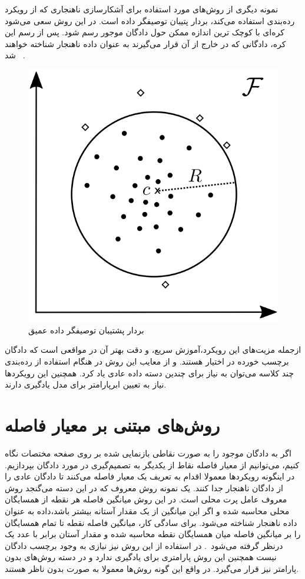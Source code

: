 \documentclass[12pt,a4paper]{report}
\theoremstyle{definition}
\theoremstyle{definition}
\begin{document}
نمونه دیگری از روش‌های مورد استفاده برای آشکارسازی ناهنجاری که از رویکرد رده‌بندی استفاده می‌کند، بردار پتیبان توصیفگر داده‌ است. در این روش سعی می‌شود کره‌ای با کوچک ترین اندازه ممکن حول دادگان موجور رسم شود. پس از رسم این کره، دادگانی که در خارج از آن قرار می‌گیرند به عنوان داده ناهنجار شناخته خواهند شد~\cite{pmlr-v80-ruff18a} .
\begin{figure}[!h]
	\begin{center}
		\includegraphics[width=0.5\linewidth]{./images/figures/svdd.png}
	\end{center}
	\caption{بردار پشتیبان توصیفگر داده عمیق~\cite{pmlr-v80-ruff18a}}
	\label{fig:deep-svdd}
	\centering
\end{figure}

ازجمله مزیت‌های این رویکرد،‌آموزش سریع، و دقت بهتر آن در مواقعی است که دادگان برچسب خورده در اختیار هستند. و از معایب این روش در هنگام استفاده از رده‌بندی چند کلاسه می‌توان به نیاز برای چندین دسته داده عادی یاد کرد. همچنین این رویکرد‌ها نیاز به تعیین ابرپارامتر برای مدل یادگیری دارند.

\section{روش‌های مبتنی بر معیار فاصله}
اگر به دادگان موجود را به صورت نقاطی بازنمایی شده بر روی صفحه مختصات نگاه کنیم،‌ می‌توانیم از معیار فاصله نقاط از یکدیگر به تصمیم‌گیری در مورد دادگان بپردازیم. در اینگونه رویکرد‌ها معمولا اقدام به تعریف یک معیار فاصله می‌کنند تا دادگان عادی را از دادگان ناهنجار جدا کنند. یک نمونه روش معروف که در این دسته می‌گنجد روش معروف عامل پرت محلی است. در این روش میانگین فاصله هر نقطه از همسایگان محلی محاسبه شده و اگر این میانگین از یک مقدار آستانه بیشتر باشد،‌داده به عنوان داده ناهنجار شناخته می‌شود. برای سادگی کار، میانگین فاصله نقطه تا تمام همسایگان را بر میانگین فاصله میان همسایگان نقطه محاسبه شده و مقدار آستان برابر با عدد یک درنظر گرفته می‌شود~\cite{10.1145/342009.335388}. در استفاده از این روش نیز نیازی به وجود برچسب دادگان نیست همچنین این روش پارامتری برای یادگیری ندارد و در دسته روش‌های بدون پارامتر نیز قرار می‌گیرد. در واقع این گونه روش‌ها معمولا به صورت بدون ناظر هستند.
\end{document}
